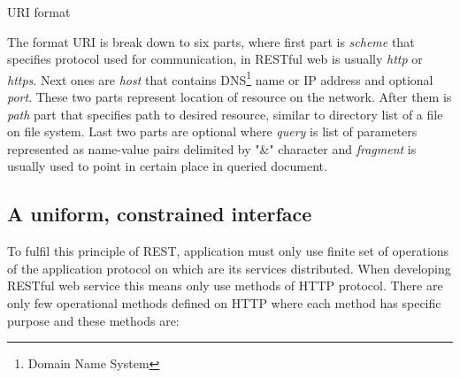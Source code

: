 \documentclass[12pt,final,oneside]{fithesis2}
\begin{document}
\begin{listing}[ht]
	\inputminted[]{bash}{sources/rest-uri.java}
	\caption{URI format}
	\label{rest-uri}
\end{listing}

The format  URI is break down to six parts, where first part is \textit{scheme} that specifies protocol used for communication, in RESTful web is usually \textit{http} or \textit{https}. Next ones are \textit{host} that contains DNS\footnote{Domain Name System} name or IP address and optional \textit{port}. These two parts represent location of resource on the network. After them is \textit{path} part that specifies path to desired resource, similar to directory list of a file on file system. Last two parts are optional where \textit{query} is list of parameters represented as name-value pairs delimited by "\&" character and \textit{fragment} is usually used to point in certain place in queried document.

\subsection*{A uniform, constrained interface}
To fulfil this principle of REST, application must only use finite set of operations of the application protocol on which are its services distributed. When developing RESTful web service this means only use methods of HTTP protocol. There are only few operational methods defined on HTTP where each method has specific purpose and these methods are:
\end{document}
